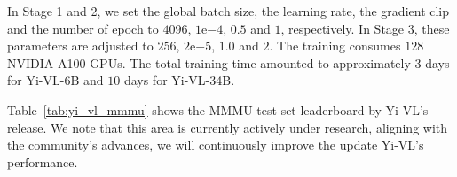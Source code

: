 

In Stage 1 and 2, we set the global batch size, the learning rate, the gradient clip and the number of epoch to $4096$, $1$e$-4$, $0.5$ and $1$, respectively. In Stage 3, these parameters are adjusted to $256$, $2$e$-5$, $1.0$ and $2$. The training consumes $128$ NVIDIA A100 GPUs. The total training time amounted to approximately $3$ days for Yi-VL-6B and $10$ days for Yi-VL-34B. %



Table~\ref{tab:yi_vl_mmmu} shows the MMMU test set leaderboard by Yi-VL's release. We note that this area is currently actively under research, aligning with the community's advances, we will continuously improve the update Yi-VL's performance. 